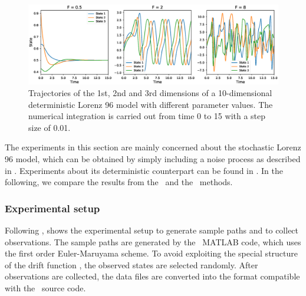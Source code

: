 \begin{figure}
    \centering
    \includegraphics[width=\textwidth]{graphics/lorenz-96-trajectories}
    \caption{Trajectories of the 1st, 2nd and 3rd dimensions of a 10-dimensional deterministic Lorenz 96 model with different parameter values. The numerical integration is carried out from time 0 to 15 with a step size of 0.01.}
    \label{fig-lorenz-96-trajectories}
\end{figure}

The experiments in this section are mainly concerned about the stochastic Lorenz 96 model, which can be obtained by simply including a noise process as described in .
Experiments about its deterministic counterpart can be found in \cite{gorbach2017scalable}.
In the following, we compare the results from the \algolpmfsde\ and the \algovgpamf\ methods.

\subsubsection*{Experimental setup}

Following \cite{vrettas2015variational},  shows the experimental setup to generate sample paths and to collect observations.
The sample paths are generated by the \algovgpamf\ MATLAB code, which uses the first order Euler-Maruyama scheme.
To avoid exploiting the special structure of the drift function , the observed states are selected randomly.
After observations are collected, the data files are converted into the format compatible with the \algolpmfsde\ source code.

